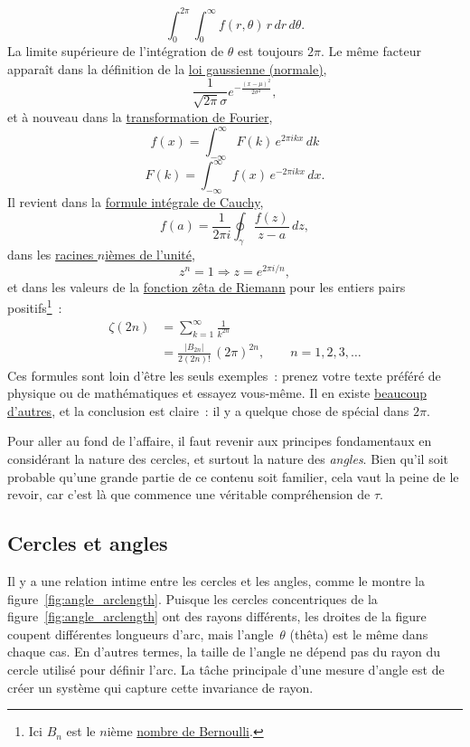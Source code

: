 \[
  \int_0^{2\pi}\int_0^\infty f(r, \theta)\, r\, dr\, d\theta.
\]
La limite supérieure de l'intégration de $\theta$ est toujours $2\pi$. Le même
facteur apparaît dans la définition de la
\href{https://fr.wikipedia.org/wiki/Loi_normale}{loi gaussienne (normale)},
\[
  \frac{1}{\sqrt{2\pi}\sigma}e^{-\frac{(x-\mu)^2}{2\sigma^2}},
\]
et à nouveau dans la
\href{https://fr.wikipedia.org/wiki/Transformation_de_Fourier}{transformation de
Fourier},
\[
  f(x) = \int_{-\infty}^\infty F(k)\, e^{2\pi ikx}\,dk
\]
\[
    F(k) = \int_{-\infty}^\infty f(x)\, e^{-2\pi ikx}\,dx.
\]
Il revient dans la
\href{https://fr.wikipedia.org/wiki/Formule_intégrale_de_Cauchy}{formule
intégrale de Cauchy},
\[
  f(a) = \frac{1}{2\pi i}\oint_\gamma\frac{f(z)}{z-a}\,dz,
\]
dans les \href{https://fr.wikipedia.org/wiki/Racine_de_l%27unité}{racines
$n$ièmes de l'unité},
\[
  z^n = 1 \Rightarrow z = e^{2\pi i/n},
\]
et dans les valeurs de la
\href{https://fr.wikipedia.org/wiki/Fonction_zêta_de_Riemann}{fonction zêta de
Riemann} pour les entiers pairs positifs\ns\footnote{Ici $B_n$ est le $n$ième
\href{https://fr.wikipedia.org/wiki/Nombre_de_Bernoulli}{nombre de
Bernoulli}.}~:
\[
\begin{split}
  \zeta(2n) & = \sum_{k=1}^\infty \frac{1}{k^{2n}} \\
            & = \frac{|B_{2n}|}{2(2n)!}\,(2\pi)^{2n},\qquad n = 1, 2, 3, \ldots
\end{split}
\]
Ces formules sont loin d'être les seuls exemples~: prenez votre texte
préféré de physique ou de mathématiques et essayez vous-même. Il en existe
\href{http://www.harremoes.dk/Peter/Undervis/Turnpage/Turnpage1.html}{beaucoup
d'autres}, et la conclusion est claire~: il y a quelque chose de spécial dans
$2\pi$.

Pour aller au fond de l'affaire, il faut revenir aux principes fondamentaux en
considérant la nature des cercles, et surtout la nature des \emph{angles}. Bien
qu'il soit probable qu'une grande partie de ce contenu soit familier, cela vaut
la peine de le revoir, car c'est là que commence une véritable compréhension de
$\tau$.

  \subsection{Cercles et angles} %
  \label{sec:circles_and_angles}

Il y a une relation intime entre les cercles et les angles, comme le montre la
figure~\ref{fig:angle_arclength}. Puisque les cercles concentriques de la
figure~\ref{fig:angle_arclength} ont des rayons différents, les droites de la
figure coupent différentes longueurs d'arc, mais l'angle~$\theta$ (thêta) est le
même dans chaque cas. En d'autres termes, la taille de l'angle ne dépend pas du
rayon du cercle utilisé pour définir l'arc. La tâche principale d'une mesure
d'angle est de créer un système qui capture cette invariance de rayon.

